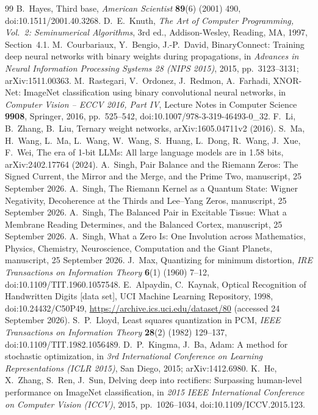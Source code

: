 \documentclass[11pt]{article}
\theoremstyle{definition}\newtheorem{definition}[theorem]{Definition}
\theoremstyle{remark}\newtheorem{remark}[theorem]{Remark}
\begin{document}
\begin{thebibliography}{99}\small
{} B.~Hayes, Third base, \emph{American Scientist} \textbf{89}(6) (2001) 490, doi:10.1511/2001.40.3268.
 D.~E.~Knuth, \emph{The Art of Computer Programming, Vol.~2: Seminumerical Algorithms}, 3rd ed., Addison-Wesley, Reading, MA, 1997, Section~4.1.
 M.~Courbariaux, Y.~Bengio, J.-P.~David, BinaryConnect: Training deep neural networks with binary weights during propagations, in \emph{Advances in Neural Information Processing Systems 28 (NIPS 2015)}, 2015, pp.~3123--3131; arXiv:1511.00363.
 M.~Rastegari, V.~Ordonez, J.~Redmon, A.~Farhadi, XNOR-Net: ImageNet classification using binary convolutional neural networks, in \emph{Computer Vision -- ECCV 2016, Part IV}, Lecture Notes in Computer Science \textbf{9908}, Springer, 2016, pp.~525--542, doi:10.1007/978-3-319-46493-0\_32.
 F.~Li, B.~Zhang, B.~Liu, Ternary weight networks, arXiv:1605.04711v2 (2016).
 S.~Ma, H.~Wang, L.~Ma, L.~Wang, W.~Wang, S.~Huang, L.~Dong, R.~Wang, J.~Xue, F.~Wei, The era of 1-bit LLMs: All large language models are in 1.58 bits, arXiv:2402.17764 (2024).
 A.~Singh, Pair Balance and the Riemann Zeros: The Signed Current, the Mirror and the Merge, and the Prime Two, manuscript, 25 September 2026.
 A.~Singh, The Riemann Kernel as a Quantum State: Wigner Negativity, Decoherence at the Thirds and Lee--Yang Zeros, manuscript, 25 September 2026.
 A.~Singh, The Balanced Pair in Excitable Tissue: What a Membrane Reading Determines, and the Balanced Cortex, manuscript, 25 September 2026.
 A.~Singh, What a Zero Is: One Involution across Mathematics, Physics, Chemistry, Neuroscience, Computation and the Giant Planets, manuscript, 25 September 2026.
 J.~Max, Quantizing for minimum distortion, \emph{IRE Transactions on Information Theory} \textbf{6}(1) (1960) 7--12, doi:10.1109/TIT.1960.1057548.
 E.~Alpaydin, C.~Kaynak, Optical Recognition of Handwritten Digits [data set], UCI Machine Learning Repository, 1998, doi:10.24432/C50P49, \url{https://archive.ics.uci.edu/dataset/80} (accessed 24 September 2026).
 S.~P.~Lloyd, Least squares quantization in PCM, \emph{IEEE Transactions on Information Theory} \textbf{28}(2) (1982) 129--137, doi:10.1109/TIT.1982.1056489.
 D.~P.~Kingma, J.~Ba, Adam: A method for stochastic optimization, in \emph{3rd International Conference on Learning Representations (ICLR 2015)}, San Diego, 2015; arXiv:1412.6980.
 K.~He, X.~Zhang, S.~Ren, J.~Sun, Delving deep into rectifiers: Surpassing human-level performance on ImageNet classification, in \emph{2015 IEEE International Conference on Computer Vision (ICCV)}, 2015, pp.~1026--1034, doi:10.1109/ICCV.2015.123.
\end{thebibliography}
\end{document}
